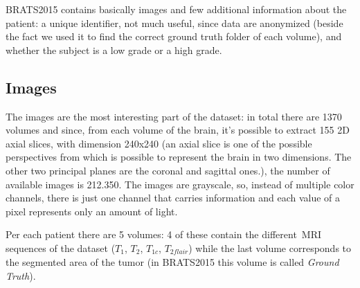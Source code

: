 BRATS2015 contains basically images and few additional information about the patient: a unique identifier, not much useful, since data are anonymized (beside the fact we used it to find the correct ground truth folder of each volume), and whether the subject is a low grade or a high grade. 

\subsection{Images}
\label{sec:images_dataset}
The images are the most interesting part of the dataset: in total there are 1370 volumes and since, from each volume of the brain, it's possible to extract 155 2D axial slices, with dimension 240x240 (an axial slice is one of the possible perspectives from which is possible to represent the brain in two dimensions. The other two principal planes are the coronal and sagittal ones.), the number of available images is 212.350. 
The images are grayscale, so, instead of multiple color channels, there is just one channel that carries information and each value of a pixel represents only an amount of light.

\vspace{2mm} %
Per each patient there are 5 volumes: 4 of these contain the different~\ac{MRI} sequences of the dataset ($T_{1}$, $T_{2}$, $T_{1\textit{c}}$, $T_{2\textit{flair}}$) while the last volume corresponds to the segmented area of the tumor (in BRATS2015 this volume is called \textit{Ground Truth}).
 
